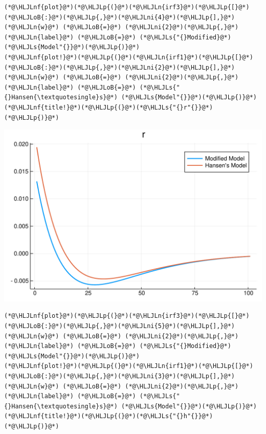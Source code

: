\documentclass[12pt,a4paper]{article}
\newcommand{\HLJLn}[1]{#1}
\newcommand{\HLJLnf}[1]{\textcolor[RGB]{66,102,213}{#1}}
\newcommand{\HLJLs}[1]{\textcolor[RGB]{201,61,57}{#1}}
\newcommand{\HLJLni}[1]{\textcolor[RGB]{59,151,46}{#1}}
\newcommand{\HLJLoB}[1]{\textcolor[RGB]{102,102,102}{\textbf{#1}}}
\newcommand{\HLJLp}[1]{#1}
\begin{document}
\begin{lstlisting}
(*@\HLJLnf{plot}@*)(*@\HLJLp{(}@*)(*@\HLJLn{irf3}@*)(*@\HLJLp{[}@*)(*@\HLJLoB{:}@*)(*@\HLJLp{,}@*)(*@\HLJLni{4}@*)(*@\HLJLp{],}@*) (*@\HLJLn{w}@*) (*@\HLJLoB{=}@*) (*@\HLJLni{2}@*)(*@\HLJLp{,}@*) (*@\HLJLn{label}@*) (*@\HLJLoB{=}@*) (*@\HLJLs{"{}Modified}@*) (*@\HLJLs{Model"{}}@*)(*@\HLJLp{)}@*)
(*@\HLJLnf{plot!}@*)(*@\HLJLp{(}@*)(*@\HLJLn{irf1}@*)(*@\HLJLp{[}@*)(*@\HLJLoB{:}@*)(*@\HLJLp{,}@*)(*@\HLJLni{2}@*)(*@\HLJLp{],}@*) (*@\HLJLn{w}@*) (*@\HLJLoB{=}@*) (*@\HLJLni{2}@*)(*@\HLJLp{,}@*) (*@\HLJLn{label}@*) (*@\HLJLoB{=}@*) (*@\HLJLs{"{}Hansen{\textquotesingle}s}@*) (*@\HLJLs{Model"{}}@*)(*@\HLJLp{)}@*)
(*@\HLJLnf{title!}@*)(*@\HLJLp{(}@*)(*@\HLJLs{"{}r"{}}@*)(*@\HLJLp{)}@*)
\end{lstlisting}

\includegraphics[width=\linewidth]{figures/yvan_15_1.pdf}

\begin{lstlisting}
(*@\HLJLnf{plot}@*)(*@\HLJLp{(}@*)(*@\HLJLn{irf3}@*)(*@\HLJLp{[}@*)(*@\HLJLoB{:}@*)(*@\HLJLp{,}@*)(*@\HLJLni{5}@*)(*@\HLJLp{],}@*) (*@\HLJLn{w}@*) (*@\HLJLoB{=}@*) (*@\HLJLni{2}@*)(*@\HLJLp{,}@*) (*@\HLJLn{label}@*) (*@\HLJLoB{=}@*) (*@\HLJLs{"{}Modified}@*) (*@\HLJLs{Model"{}}@*)(*@\HLJLp{)}@*)
(*@\HLJLnf{plot!}@*)(*@\HLJLp{(}@*)(*@\HLJLn{irf1}@*)(*@\HLJLp{[}@*)(*@\HLJLoB{:}@*)(*@\HLJLp{,}@*)(*@\HLJLni{3}@*)(*@\HLJLp{],}@*) (*@\HLJLn{w}@*) (*@\HLJLoB{=}@*) (*@\HLJLni{2}@*)(*@\HLJLp{,}@*) (*@\HLJLn{label}@*) (*@\HLJLoB{=}@*) (*@\HLJLs{"{}Hansen{\textquotesingle}s}@*) (*@\HLJLs{Model"{}}@*)(*@\HLJLp{)}@*)
(*@\HLJLnf{title!}@*)(*@\HLJLp{(}@*)(*@\HLJLs{"{}h"{}}@*)(*@\HLJLp{)}@*)
\end{lstlisting}
\end{document}
